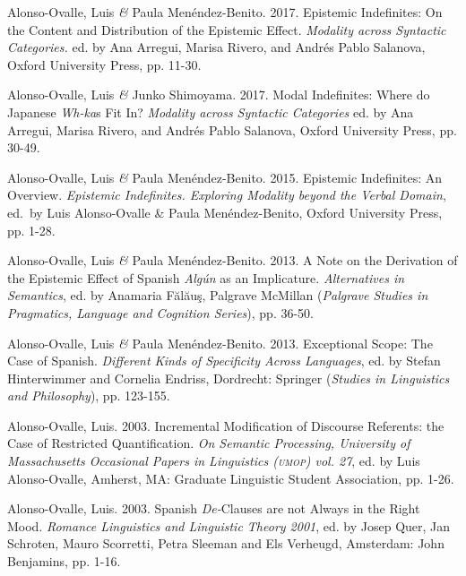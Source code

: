 \documentclass[11pt]{article}
\begin{document}
Alonso-Ovalle, Luis \textit{\&} Paula Men\'endez-Benito. 2017. Epistemic Indefinites: On the Content and Distribution of the Epistemic Effect. \textit{Modality across Syntactic Categories.} ed. by Ana Arregui, Marisa Rivero, and Andr\'es Pablo Salanova, Oxford University Press, pp. 11-30.

Alonso-Ovalle, Luis \textit{\&} Junko Shimoyama. 2017. Modal Indefinites: Where do Japanese \textit{Wh-ka}s Fit In? \textit{Modality across Syntactic Categories} ed. by Ana Arregui, Marisa Rivero, and Andr\'es Pablo Salanova, Oxford University Press,  pp. 30-49.

Alonso-Ovalle, Luis \textit{\&} Paula Men\'endez-Benito. 2015. Epistemic Indefinites: An Overview. \textit{Epistemic Indefinites. Exploring Modality beyond the Verbal Domain}, ed.\ by Luis Alonso-Ovalle \& Paula Men\'endez-Benito, Oxford University Press, pp. 1-28.

Alonso-Ovalle, Luis \textit{\&} Paula Men\'endez-Benito. 2013. A Note on the Derivation of the Epistemic Effect of Spanish
\textit{Alg\'un} as an Implicature. \textit{Alternatives in Semantics}, ed. by
Anamaria F\u{a}l\u{a}u\c{s}, Palgrave McMillan (\textit{Palgrave
  Studies in Pragmatics, Language and Cognition Series}), pp. 36-50.

Alonso-Ovalle, Luis \textit{\&} Paula Men\'endez-Benito. 2013. Exceptional Scope: The Case of Spanish. \textit{Different Kinds of Specificity Across Languages}, ed. by
Stefan Hinterwimmer and Cornelia Endriss, Dordrecht: Springer
(\textit{Studies in Linguistics and Philosophy}), pp. 123-155.

Alonso-Ovalle, Luis. 2003. Incremental Modification of Discourse Referents: the Case of Restricted Quantification. \textit{On Semantic Processing, University of Massachusetts Occasional Papers in Linguistics (\textsc{umop}) vol. 27}, ed. by Luis Alonso-Ovalle, Amherst, MA: Graduate Linguistic Student Association, pp. 1-26.

Alonso-Ovalle, Luis. 2003. Spanish {\it De-}Clauses are not Always in the Right Mood. {\it Romance Linguistics and Linguistic Theory 2001}, ed. by Josep Quer, Jan Schroten, Mauro Scorretti, Petra Sleeman and Els Verheugd, Amsterdam: John Benjamins, pp. 1-16. 
\end{document}
